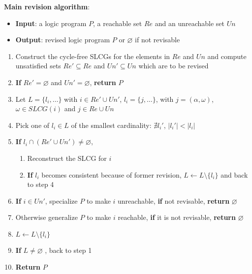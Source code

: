    \textbf{Main revision algorithm}:
    \begin{itemize}
        \item \textbf{Input}: a logic program $P$, a reachable set $Re$ and an unreachable set $Un$
        \item \textbf{Output}: revised logic program $P$ or $\varnothing$ if not revisable
    \end{itemize}
    \begin{enumerate}
        \item Construct the cycle-free SLCGs for the elements in $Re$ and $Un$ and compute unsatisfied sets $Re'\subseteq Re$ and $Un'\subseteq Un$ which are to be revised
        \item \textbf{If} $Re'=\varnothing$ and $Un'=\varnothing$, \textbf{return} $P$
        \item Let $L=\{l_i,\ldots\}$ with $i\in Re' \cup Un'$, $l_i=\{j,\ldots\}$, with $j=(\alpha,\omega)$, $\omega \in SLCG(i)$ and $ j\in Re\cup Un$ \label{step:dependency}
        \item Pick one of $l_i\in L$ of the smallest cardinality: $\nexists l_i'$, $|l_i'| < |l_i|$ \label{step:cardinality}
        \item \textbf{If} $l_i\cap (Re'\cup Un')\neq\varnothing$, \label{step:check}
        \begin{enumerate}
            \item Reconstruct the SLCG for $i$
            \item \textbf{If} $l_i$ becomes consistent because of former revision, $L\gets L\setminus \{l_i\}$ and back to step 4
        \end{enumerate}
        \item \textbf{If} $i\in Un'$, specialize $P$ to make $i$ unreachable, \textbf{if} not revisable, \textbf{return} $\varnothing$ \label{step:specialize}
        \item Otherwise generalize $P$ to make $i$ reachable, \textbf{if} it is not revisable, \textbf{return} $\varnothing$ \label{step:generalize}
        
        \item $L\gets L\setminus\{l_i\}$ \label{step:update}
        \item \textbf{If} $L\neq\varnothing$ , back to step 1 \label{step:recheck}
        \item \textbf{Return} $P$
    \end{enumerate} 

